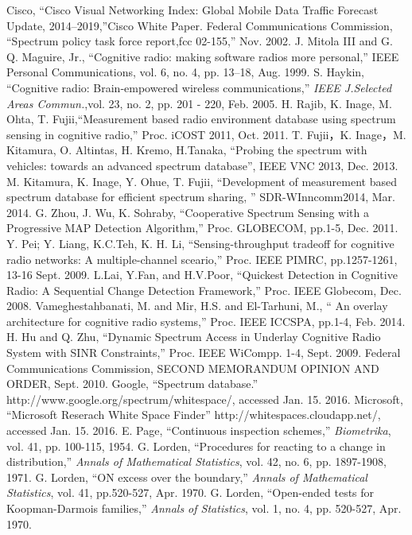 \begin{thebibliography}{99}
Cisco, ``Cisco Visual Networking Index: Global Mobile Data Traffic Forecast Update, 2014–2019,''Cisco White Paper.
Federal Communications Commission, ``Spectrum policy task force report,fcc 02-155,'' Nov. 2002.
J. Mitola III and G. Q. Maguire, Jr., ``Cognitive radio: making software radios more personal,'' IEEE Personal Communications, vol. 6, no. 4, pp. 13–18, Aug. 1999.
 S. Haykin, ``Cognitive radio: Brain-empowered wireless communications,'' {\it IEEE J.Selected Areas Commun.},vol. 23, no. 2, pp. 201 - 220, Feb. 2005.
H. Rajib, K. Inage, M. Ohta, T. Fujii,``Measurement based radio environment database using spectrum sensing in cognitive radio,'' Proc. iCOST 2011, Oct. 2011.
T. Fujii，K. Inage，M. Kitamura, O. Altintas, H. Kremo, H.Tanaka, ``Probing the spectrum with vehicles: towards an advanced spectrum database'', IEEE VNC 2013, Dec. 2013.
M. Kitamura, K. Inage, Y. Ohue, T. Fujii, ``Development of measurement based spectrum database for efficient spectrum sharing, '' SDR-WInncomm2014, Mar. 2014.
G. Zhou, J. Wu, K. Sohraby, ``Cooperative Spectrum Sensing with a Progressive MAP Detection Algorithm,'' Proc. GLOBECOM, pp.1-5, Dec. 2011.
Y. Pei; Y. Liang, K.C.Teh, K. H. Li, ``Sensing-throughput tradeoff for cognitive radio networks: A multiple-channel sceario,'' Proc. IEEE PIMRC, pp.1257-1261, 13-16 Sept. 2009.
L.Lai, Y.Fan, and H.V.Poor, ``Quickest Detection in Cognitive Radio: A Sequential Change Detection Framework,'' Proc. IEEE Globecom, Dec. 2008.
Vameghestahbanati, M. and Mir, H.S. and El-Tarhuni, M., `` An overlay architecture for cognitive radio systems,'' Proc. IEEE ICCSPA, pp.1-4, Feb. 2014.
H. Hu and Q. Zhu, ``Dynamic Spectrum Access in Underlay Cognitive Radio System with SINR Constraints,'' Proc. IEEE WiCompp. 1-4, Sept. 2009.
Federal Communications Commission, SECOND MEMORANDUM OPINION AND ORDER, Sept. 2010.
Google, ``Spectrum database.'' http://www.google.org/spectrum/whitespace/, accessed Jan. 15. 2016.
Microsoft, ``Microsoft Reserach White Space Finder'' http://whitespaces.cloudapp.net/, accessed Jan. 15. 2016.
E. Page, ``Continuous inspection schemes,'' {\it Biometrika}, vol. 41, pp. 100-115, 1954.
G. Lorden, ``Procedures for reacting to a change in distribution,'' {\it Annals of Mathematical Statistics}, vol. 42, no. 6, pp. 1897-1908, 1971.  
G. Lorden, ``ON excess over the boundary,'' {\it Annals of Mathematical Statistics}, vol. 41, pp.520-527, Apr. 1970.
G. Lorden, ``Open-ended tests for Koopman-Darmois families,'' {\it Annals of Statistics}, vol. 1, no. 4, pp. 520-527, Apr. 1970.
\end{thebibliography}
